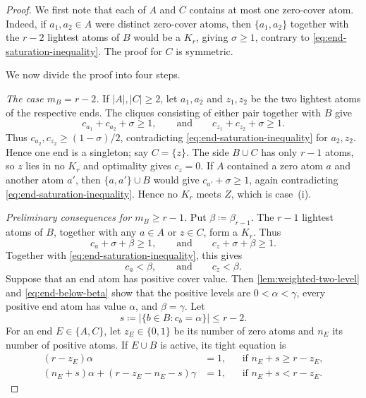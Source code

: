 \documentclass[10pt]{article}
\numberwithin{equation}{section}
\begin{document}
\begin{proof}
We first note that each of $A$ and $C$ contains at most one zero-cover atom.  Indeed, if $a_1,a_2\in A$ were distinct zero-cover atoms, then $\{a_1,a_2\}$ together with the $r-2$ lightest atoms of $B$ would be a $K_r$, giving $\sigma\ge1$, contrary to \cref{eq:end-saturation-inequality}.  The proof for $C$ is symmetric.

We now divide the proof into four steps.

\smallskip
\noindent\emph{The case $m_B=r-2$.}
If $|A|,|C|\ge2$, let $a_1,a_2$ and $z_1,z_2$ be the two lightest atoms of the respective ends.  The cliques consisting of either pair together with $B$ give
\[
 c_{a_1}+c_{a_2}+\sigma\ge1,
 \qquad\text{and}\qquad
 c_{z_1}+c_{z_2}+\sigma\ge1.
\]
Thus $c_{a_2},c_{z_2}\ge(1-\sigma)/2$, contradicting \cref{eq:end-saturation-inequality} for $a_2,z_2$.  Hence one end is a singleton; say $C=\{z\}$.  The side $B\cup C$ has only $r-1$ atoms, so $z$ lies in no $K_r$ and optimality gives $c_z=0$.  If $A$ contained a zero atom $a$ and another atom $a'$, then $\{a,a'\}\cup B$ would give $c_{a'}+\sigma\ge1$, again contradicting \cref{eq:end-saturation-inequality}.  Hence no $K_r$ meets $Z$, which is case~\textup{(i)}.

\smallskip
\noindent\emph{Preliminary consequences for $m_B\ge r-1$.}
Put $\beta\coloneqq\beta_{r-1}$.  The $r-1$ lightest atoms of $B$, together with any $a\in A$ or $z\in C$, form a $K_r$.  Thus
\[
 c_a+\sigma+\beta\ge1,
 \qquad\text{and}\qquad
 c_z+\sigma+\beta\ge1.
\]
Together with \cref{eq:end-saturation-inequality}, this gives
\begin{equation}\label{eq:end-below-beta}
 c_a<\beta,
 \qquad\text{and}\qquad
 c_z<\beta.
\end{equation}
Suppose that an end atom has positive cover value.  Then \cref{lem:weighted-two-level} and \cref{eq:end-below-beta} show that the positive levels are $0<\alpha<\gamma$, every positive end atom has value $\alpha$, and $\beta=\gamma$.  Let
\[
 s\coloneqq|\{b\in B\colon c_b=\alpha\}|\le r-2.
\]
For an end $E\in\{A,C\}$, let $z_E\in\{0,1\}$ be its number of zero atoms and $n_E$ its number of positive atoms.  If $E\cup B$ is active, its tight equation is
\begin{align}
 (r-z_E)\alpha&=1,
 &&\text{if }n_E+s\ge r-z_E,\label{eq:alpha-threshold}\\
 (n_E+s)\alpha+(r-z_E-n_E-s)\gamma&=1,
 &&\text{if }n_E+s<r-z_E.\label{eq:gamma-threshold}
\end{align}


\end{proof}
\end{document}
